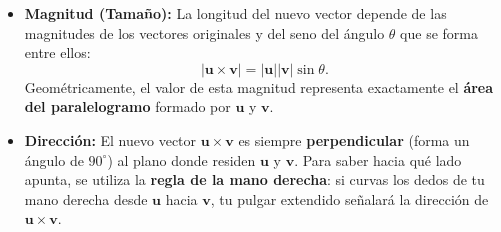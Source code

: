 \documentclass[11pt,a4paper]{book}
\begin{document}
\begin{itemize}
    \item \textbf{Magnitud (Tamaño):} La longitud del nuevo vector depende de las magnitudes de los vectores originales y del seno del ángulo $\theta$ que se forma entre ellos:
    \begin{equation}
        |\boldsymbol{u} \times \boldsymbol{v}| = |\boldsymbol{u}| |\boldsymbol{v}| \sin\theta.
    \end{equation}
    Geométricamente, el valor de esta magnitud representa exactamente el \textbf{área del paralelogramo} formado por $\boldsymbol{u}$ y $\boldsymbol{v}$.
    
    \item \textbf{Dirección:} El nuevo vector $\boldsymbol{u} \times \boldsymbol{v}$ es siempre \textbf{perpendicular} (forma un ángulo de $90^\circ$) al plano donde residen $\boldsymbol{u}$ y $\boldsymbol{v}$. Para saber hacia qué lado apunta, se utiliza la \textbf{regla de la mano derecha}: si curvas los dedos de tu mano derecha desde $\boldsymbol{u}$ hacia $\boldsymbol{v}$, tu pulgar extendido señalará la dirección de $\boldsymbol{u} \times \boldsymbol{v}$.
\end{itemize}

\begin{center}
\end{center}
\end{document}
